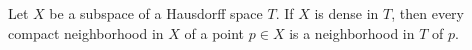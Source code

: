 Let $X$ be a subspace of a Hausdorff space $T$. If $X$ is dense in $T$, then every compact neighborhood in $X$ of a point $p \in X$ is a neighborhood in $T$ of $p$.
